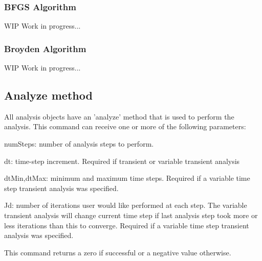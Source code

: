 \subsubsection{BFGS Algorithm}
WIP Work in progress...

\subsubsection{Broyden Algorithm}
WIP Work in progress...


\subsection{Analyze method}
All analysis objects have an 'analyze' method that is used to perform the analysis. This command can receive one or more of the following parameters:

\begin{description}
  \item{numSteps}: number of analysis steps to perform.
  \item{dt}: time-step increment. Required if transient or variable transient analysis
  \item{dtMin,dtMax}: minimum and maximum time steps. Required if a variable time step transient analysis was specified.
  \item{Jd}: number of iterations user would like performed at each step. The variable transient analysis will change current time step if last analysis step took more or less iterations than this to converge. Required if a variable time step transient analysis was specified.
\end{description}

This command returns a zero if successful or a negative value otherwise.

